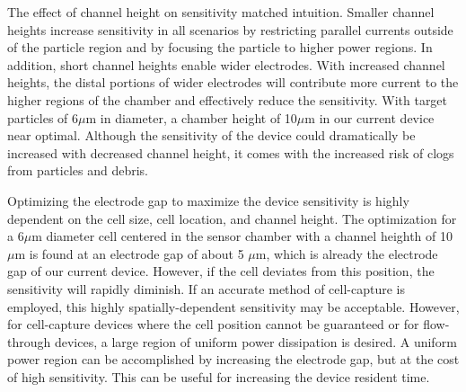 \par The effect of channel height on sensitivity matched intuition. Smaller channel heights increase sensitivity in all scenarios by restricting parallel currents outside of the particle region and by focusing the particle to higher power regions. In addition, short channel heights enable wider electrodes. With increased channel heights, the distal portions of wider electrodes will contribute more current to the higher regions of the chamber and effectively reduce the sensitivity. With target particles of 6$\mu$m in diameter, a chamber height of 10$\mu$m in our current device near optimal. Although the sensitivity of the device could dramatically be increased with decreased channel height, it comes with the increased risk of clogs from particles and debris.

\par Optimizing the electrode gap to maximize the device sensitivity is highly dependent on the cell size, cell location, and channel height. The optimization for a 6$\mu$m  diameter cell centered in the sensor chamber with a channel heighth of 10 $\mu$m is found at an electrode gap of about 5 $\mu$m, which is already the electrode gap of our current device. However, if the cell deviates from this position, the sensitivity will rapidly diminish. If an accurate method of cell-capture is employed, this highly spatially-dependent sensitivity may be acceptable. However, for cell-capture devices where the cell position cannot be guaranteed or for flow-through devices, a large region of uniform power dissipation is desired. A uniform power region can be accomplished by increasing the electrode gap, but at the cost of high sensitivity. This can be useful for increasing the device resident time. 


